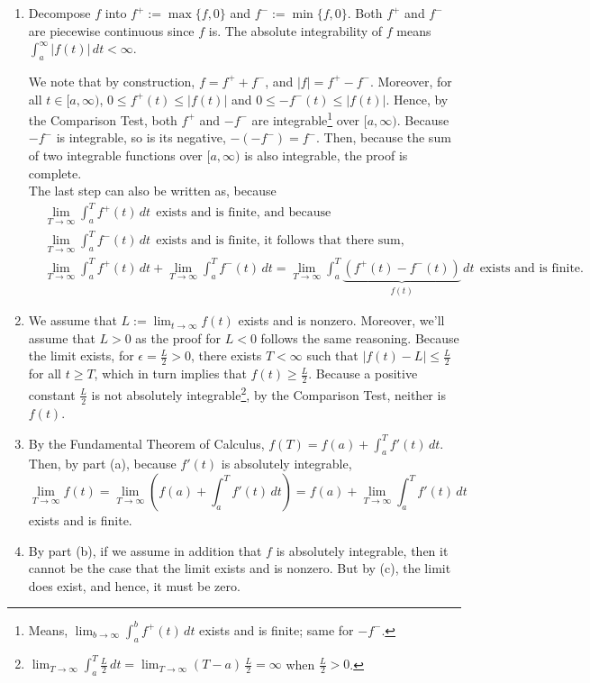 \begin{enumerate}
\renewcommand{\labelenumi}{(\alph{enumi})}
\setlength{\itemsep}{.2cm}
    \item  Decompose \(f\) into \(f^+ := \max\{f, 0\}\) and \(f^- := \min\{f, 0\}\). Both \(f^+\) and \(f^-\) are piecewise continuous since \(f\) is. The absolute integrability of \(f\) means \(\int_a^\infty |f(t)| \, dt < \infty\). 
    
    We note that by construction, $f=f^+ + f^-$, and $|f| = f^+ - f^-.$  
   Moreover, for all $t\in [a, \infty)$, $0 \le f^+(t) \le |f(t)|$ and $0 \le -f^-(t) \le |f(t)|$. Hence, by the Comparison Test, both \(f^+\) and \(-f^-\) are integrable\footnote{Means, $\displaystyle \lim_{b \to \infty} \int_a^b f^+(t) \, dt$ exists and is finite; same for $-f^-$. \bigskip} over $[a, \infty)$. Because $-f^-$ is integrable, so is its negative, $-\left(-f^- \right) = f^-$. Then, because the sum of two integrable functions over $[a, \infty)$ is also integrable, the proof is complete. \\
   
   The last step can also be written as, because
   \begin{align*}
       &\lim_{T \to \infty} \int_a^T f^+(t) \, dt  ~~\text{exists and is finite, and because } \\[1em]
        &\lim_{T \to \infty} \int_a^T f^-(t) \, dt ~~ \text{exists and is finite, it follows that there sum,} \\[1em]
         &\lim_{T \to \infty} \int_a^T f^+(t) \, dt  + \lim_{T \to \infty} \int_a^T f^-(t) \, dt = \lim_{T \to \infty} \int_a^T \underbrace{\left(f^+(t) - f^-(t) \right)}_{f(t)} \, dt  ~~ \text{exists and is finite. } 
   \end{align*}
   

    \item We assume that  $ L:=\displaystyle \lim_{t \to \infty} f(t)$ exists and is nonzero. Moreover, we'll assume that $L>0$ as the proof for $L<0$ follows the same reasoning. Because the limit exists, for $\epsilon = \frac{L}{2}>0$, there exists $T < \infty $ such that $|f(t) -L| \le \frac{L}{2}$ for all $t\ge T$, which in turn implies that $f(t)\ge \frac{L}{2}$. Because a positive constant $\frac{L}{2}$ is not absolutely integrable\footnote{$\displaystyle \lim_{T \to \infty} \int_a^T \frac{L}{2} \, dt =  \lim_{T \to \infty} (T-a)\,  \frac{L}{2} = \infty$ when $\frac{L}{2}>0$.}, by the Comparison Test, neither is $f(t)$.

    
    \item By the Fundamental Theorem of Calculus, $f(T) = f(a) + \int_a^T f'(t)\, dt$. Then, by part (a), because $f'(t)$ is absolutely integrable, 
    $$\lim_{T \to \infty} f(t) = \lim_{T \to \infty} \left(f(a) + \int_a^T f'(t)\, dt \right) =   f(a) + \lim_{T \to \infty} \int_a^T f'(t)\, dt $$
    exists and is finite. 

    \item By part (b), if we assume in addition that $f$ is absolutely integrable, then it cannot be the case that the limit exists and is nonzero. But by (c), the limit does exist, and hence, it must be zero. 
\end{enumerate}
\Qed

 


